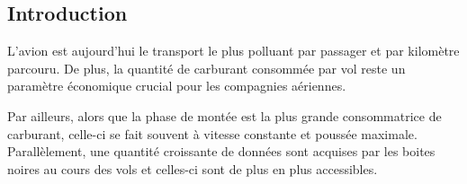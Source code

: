 \documentclass[a0,portrait]{a0poster}
\begin{document}
\begin{multicols}{2} %



%
%


\color{DarkSlateGray}

\section{Introduction}
\color{Navy} %
L'avion est aujourd'hui le transport le plus polluant par passager et par kilomètre parcouru. De plus, la quantité de carburant consommée par vol reste un paramètre économique crucial pour les compagnies aériennes. 

Par ailleurs, alors que la phase de montée est la plus grande consommatrice de carburant, celle-ci se fait souvent à vitesse constante et poussée maximale. Parallèlement, une quantité croissante de données sont acquises par les boites noires au cours des vols et celles-ci sont de plus en plus accessibles.
\newline


\end{multicols}
\end{document}
